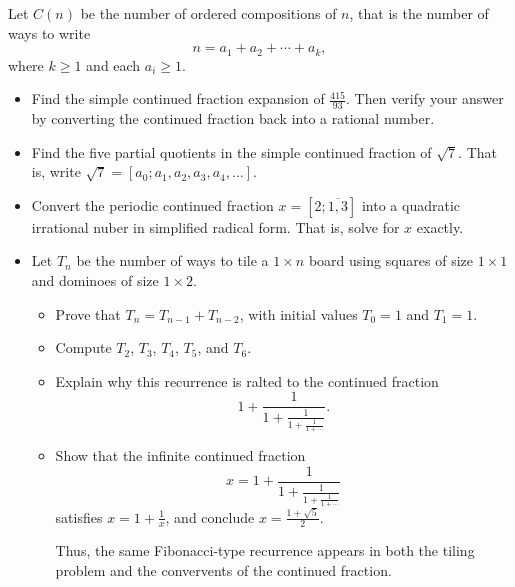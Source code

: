 \documentclass[12pt]{amsart}
\begin{document}
\begin{onehalfspace}
        Let $C(n)$ be the number of ordered compositions of $n$, that is the number of ways to write
        \[
            n = a_1 + a_2 + \cdots + a_k,
        \]
        where $k\ge 1$ and each $a_i \ge 1$.
        \begin{itemize}
            \item[(a)] Find the simple continued fraction expansion of $\frac{415}{93}$.
            Then verify your answer by converting the continued fraction back into a rational number.
            \item[(b)] Find the five partial quotients in the simple continued fraction of $\sqrt{7}$.
            That is, write $\sqrt{7} = [a_0; a_1, a_2, a_3, a_4, \dots]$.
            \item[(c)] Convert the periodic continued fraction $x = [2;\overline{1, 3}]$ into a
            quadratic irrational nuber in simplified radical form.
            That is, solve for $x$ exactly.
            \item[(d)] Let $T_n$ be the number of ways to tile a $1\times n$ board using squares
            of size $1 \times 1$ and dominoes of size $1\times 2$.
            \begin{itemize}
                \item[(a)] Prove that $T_n = T_{n-1} + T_{n-2}$, with initial values $T_0 = 1$ and
                $T_1 = 1$.
                \item[(b)] Compute $T_2$, $T_3$, $T_4$, $T_5$, and $T_6$.
                \item[(c)] Explain why this recurrence is ralted to the continued fraction
                \[
                    1+ \frac{1}{1+\frac{1}{1 + \frac{1}{1+\cdots}}}.
                \]
                \item[(d)] Show that the infinite continued fraction
                \[
                    x = 1+ \frac{1}{1+\frac{1}{1 + \frac{1}{1+\cdots}}}
                \]
                satisfies $x = 1 + \frac{1}{x}$, and conclude $x = \frac{1 + \sqrt{5}}{2}$.

                Thus, the same Fibonacci-type recurrence appears in both the tiling problem and
                the convervents of the continued fraction.
            \end{itemize}
        \end{itemize}


\end{onehalfspace}
\end{document}
